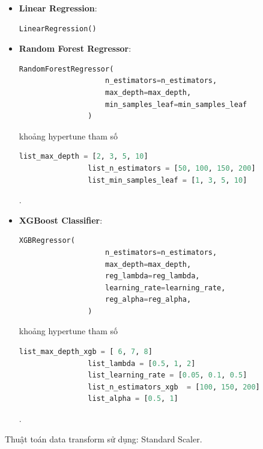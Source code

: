     \begin{itemize}
        \item \textbf{Linear Regression}: 

            \begin{lstlisting}[language=Python]
                LinearRegression()
            \end{lstlisting}

        \item \textbf{Random Forest Regressor}:

            \begin{lstlisting}[language=Python]
                RandomForestRegressor(
                    n_estimators=n_estimators, 
                    max_depth=max_depth, 
                    min_samples_leaf=min_samples_leaf
                )
            \end{lstlisting}

            khoảng hypertune tham số

            \begin{lstlisting}[language=Python]
                list_max_depth = [2, 3, 5, 10]
                list_n_estimators = [50, 100, 150, 200]
                list_min_samples_leaf = [1, 3, 5, 10]
            \end{lstlisting}.

        \item \textbf{XGBoost Classifier}:
            \begin{lstlisting}[language=Python]
                XGBRegressor(
                    n_estimators=n_estimators, 
                    max_depth=max_depth, 
                    reg_lambda=reg_lambda,
                    learning_rate=learning_rate,
                    reg_alpha=reg_alpha,
                )
            \end{lstlisting}

            khoảng hypertune tham số

            \begin{lstlisting}[language=Python]
                list_max_depth_xgb = [ 6, 7, 8]
                list_lambda = [0.5, 1, 2]
                list_learning_rate = [0.05, 0.1, 0.5]
                list_n_estimators_xgb  = [100, 150, 200]
                list_alpha = [0.5, 1]
            \end{lstlisting}.
        
    \end{itemize}

    Thuật toán data transform sử dụng: Standard Scaler.


